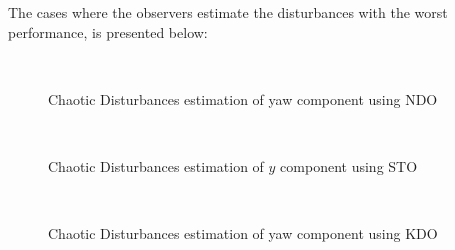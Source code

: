 \documentclass[letterpaper%
, twoside%
, 12pt%
,memoire%
, english%
,creativecommons,hyperref%
]{thETS}
\begin{document}
The cases where the observers estimate the disturbances with the worst performance, is presented below:

\begin{figure}[H]
\centering
{}
\\ \parbox{0.75\textwidth}{\caption{Chaotic Disturbances estimation of yaw component using NDO}\label{dis_m1_est_yaw_ndo}}
\end{figure}

\begin{figure}[H]
\centering
{}
\\ \parbox{0.75\textwidth}{\caption{Chaotic Disturbances estimation of $y$ component using STO}\label{dis_m1_est_y_sto}}
\end{figure}

\begin{figure}[H]
\centering
{}
\\ \parbox{0.75\textwidth}{\caption{Chaotic Disturbances estimation of yaw component using KDO}\label{dis_m1_est_yaw_kdo}}
\end{figure}
\end{document}
